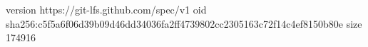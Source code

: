 version https://git-lfs.github.com/spec/v1
oid sha256:c5f5a6f06d39b09d46dd34036fa2ff4739802cc2305163c72f14c4ef8150b80e
size 174916
